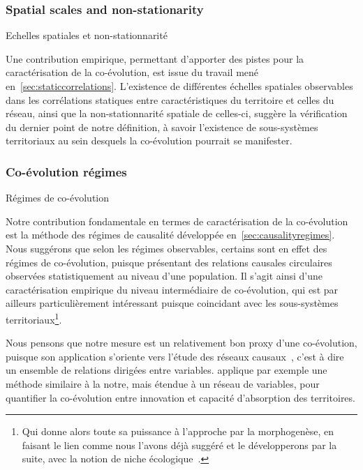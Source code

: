 \subsubsection{Spatial scales and non-stationarity}{Echelles spatiales et non-stationnarité}

Une contribution empirique, permettant d'apporter des pistes pour la caractérisation de la co-évolution, est issue du travail mené en~\ref{sec:staticcorrelations}. L'existence de différentes échelles spatiales observables dans les corrélations statiques entre caractéristiques du territoire et celles du réseau, ainsi que la non-stationnarité spatiale de celles-ci, suggère la vérification du dernier point de notre définition, à savoir l'existence de sous-systèmes territoriaux au sein desquels la co-évolution pourrait se manifester.




\subsubsection{Co-évolution régimes}{Régimes de co-évolution}

Notre contribution fondamentale en termes de caractérisation de la co-évolution est la méthode des régimes de causalité développée en~\ref{sec:causalityregimes}. Nous suggérons que selon les régimes observables, certains sont en effet des régimes de co-évolution, puisque présentant des relations causales circulaires observées statistiquement au niveau d'une population. Il s'agit ainsi d'une caractérisation empirique du niveau intermédiaire de co-évolution, qui est par ailleurs particulièrement intéressant puisque coincidant avec les sous-systèmes territoriaux\footnote{Qui donne alors toute sa puissance à l'approche par la morphogenèse, en faisant le lien comme nous l'avons déjà suggéré et le développerons par la suite, avec la notion de niche écologique~\cite{holland2012signals}.}.

Nous pensons que notre mesure est un relativement bon proxy d'une co-évolution, puisque son application s'oriente vers l'étude des réseaux causaux~\cite{seth2005causal}, c'est à dire un ensemble de relations dirigées entre variables. \cite{castellacci2013dynamics} applique par exemple une méthode similaire à la notre, mais étendue à un réseau de variables, pour quantifier la co-évolution entre innovation et capacité d'absorption des territoires.

